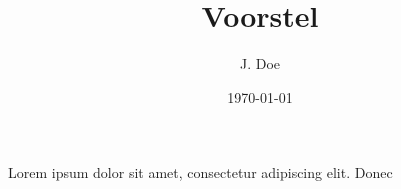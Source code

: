 \documentclass{article}
\title{Voorstel}
\author{J. Doe}
\date{\today}
\begin{document}
\maketitle
Lorem ipsum dolor sit amet, consectetur adipiscing elit. Donec
\end{document}
